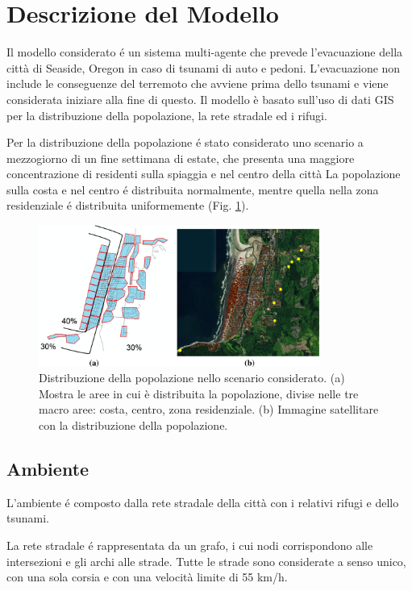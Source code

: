 \section{Descrizione del Modello}
Il modello considerato \cite{mostafizi2019agent} é un sistema multi-agente che prevede l'evacuazione della città di Seaside, Oregon in caso di tsunami di auto e pedoni.
%
L'evacuazione non include le conseguenze del terremoto che avviene prima dello tsunami e viene considerata iniziare alla fine di questo.
Il modello è basato sull'uso di dati GIS per la distribuzione della popolazione, la rete stradale ed i rifugi.

%
Per la distribuzione della popolazione é stato considerato uno scenario a mezzogiorno di un fine settimana di estate,
che presenta una maggiore concentrazione di residenti sulla spiaggia e nel centro della città
La popolazione sulla costa e nel centro é distribuita normalmente,
mentre quella nella zona residenziale é distribuita uniformemente (Fig. \ref{fig:population}).

\begin{figure}[ht]
  \centering
  \includegraphics[width=0.82\textwidth]{images/population}
  \caption{Distribuzione della popolazione nello scenario considerato.
    (a) Mostra le aree in cui è distribuita la popolazione, divise nelle tre macro aree: costa, centro, zona residenziale.
    (b) Immagine satellitare con la distribuzione della popolazione.}
  \label{fig:population}
\end{figure}

\subsection{Ambiente}
L'ambiente é composto dalla rete stradale della città con i relativi rifugi e dello tsunami.

La rete stradale é rappresentata da un grafo, i cui nodi corrispondono alle intersezioni e gli archi alle strade.
Tutte le strade sono considerate a senso unico, con una sola corsia e con una velocità limite di 55 km/h.

